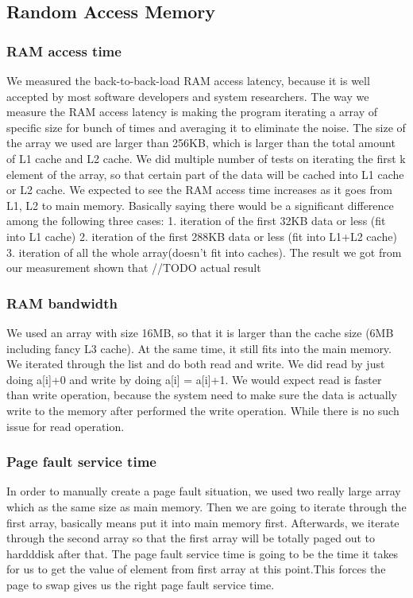 \subsection{Random Access Memory}

\subsubsection{RAM access time}
We measured the back-to-back-load RAM access latency, because it is well accepted by most software developers and system researchers. The way we measure the RAM access latency is making the program iterating a array of specific size for bunch of times and averaging it to eliminate the noise. The size of the array we used are larger than 256KB, which is larger than the total amount of L1 cache and L2 cache. We did multiple number of tests on iterating the first k element of the array, so that certain part of the data will be cached into L1 cache or L2 cache.
We expected to see the RAM access time increases as it goes from L1, L2 to main memory. Basically saying there would be a significant difference among the following three cases: 
1. iteration of the first 32KB data or less (fit into L1 cache)
2. iteration of the first 288KB data or less (fit into L1+L2 cache)
3. iteration of all the whole array(doesn’t fit into caches).
The result we got from our measurement shown that //TODO actual result






\subsubsection{RAM bandwidth}

We used an array with size 16MB, so that it is larger than the cache size (6MB including fancy L3 cache). At the same time, it still fits into the main memory. We iterated through the list and do both read and write. We did read by just doing a[i]+0 and write by doing a[i] = a[i]+1. We would expect read is faster than write operation, because the system need to make sure the data is actually write to the memory after performed the write operation. While there is no such issue for read operation.





\subsubsection{Page fault service time}

In order to manually create a page fault situation, we used two really large array which as the same size as main memory. Then we are going to iterate through the first array, basically means put it into main memory first. Afterwards, we iterate through the second array so that the first array will be totally paged out to hardddisk after that. The page fault service time is going to be the time it takes for us to get the value of element from first array at this point.This forces the page to swap gives us the right page fault service time. 